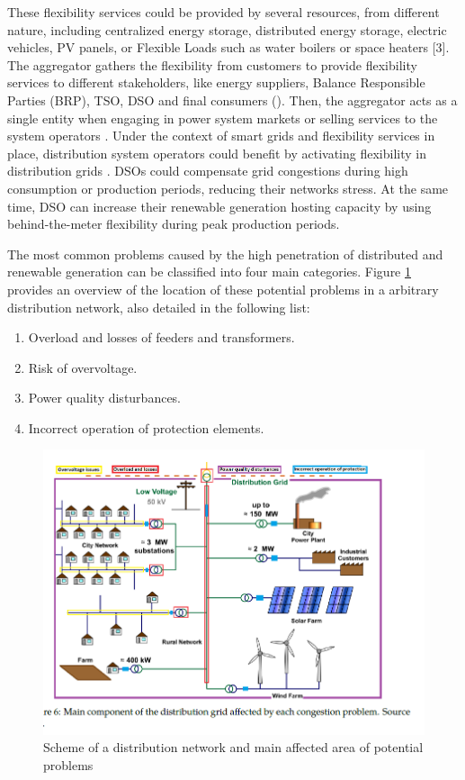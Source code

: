 These flexibility services could be provided by several resources, from different nature, including centralized energy storage, distributed energy storage, electric vehicles, PV panels, or Flexible Loads such as water boilers or space heaters [3]. The aggregator gathers the flexibility from customers to provide flexibility services to different stakeholders, like energy suppliers, Balance Responsible Parties (BRP), TSO, DSO and final consumers (\cite{USEFFoundation2015a, Olivella2018}). Then, the aggregator acts as a single entity when engaging in power system markets or selling services to the system operators \cite{BURGER2017}. Under the context of smart grids and flexibility services in place, distribution system operators could benefit by activating flexibility in distribution grids \cite{USEFFoundation2015a, spiliotis2016demand, esmat2016conf, hashemi2016}. DSOs could compensate grid congestions during high consumption or production periods, reducing their networks stress. At the same time, DSO can increase their renewable generation hosting capacity by using behind-the-meter flexibility during peak production periods. 

The most common problems caused by the high penetration of distributed and renewable generation can be classified into four main categories. Figure \ref{fig:network_problems} provides an overview of the location of these potential problems in a arbitrary distribution network, also detailed in the following list:  

\begin{enumerate}
\item Overload and losses of feeders and transformers. 
\item Risk of overvoltage.
\item Power quality disturbances.
\item Incorrect operation of protection elements. 
\end{enumerate}

\begin{figure}[h]
	\centering
	\includegraphics[width=1\columnwidth]{ChapterOPF_DSO/Figures/network_problems.png}
		\caption{Scheme of a distribution network and main affected area of potential problems}
	\label{fig:network_problems}  
\end{figure}

